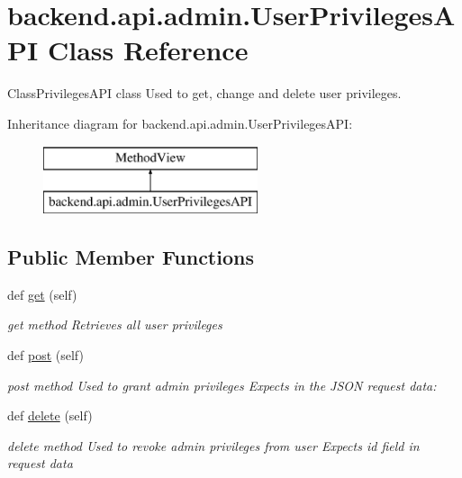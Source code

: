 \hypertarget{classbackend_1_1api_1_1admin_1_1_user_privileges_a_p_i}{}\section{backend.\+api.\+admin.\+User\+Privileges\+A\+P\+I Class Reference}
\label{classbackend_1_1api_1_1admin_1_1_user_privileges_a_p_i}


Class\+Privileges\+A\+P\+I class Used to get, change and delete user privileges.  


Inheritance diagram for backend.\+api.\+admin.\+User\+Privileges\+A\+P\+I\+:\begin{figure}[H]
\begin{center}
\leavevmode
\includegraphics[height=2.000000cm]{classbackend_1_1api_1_1admin_1_1_user_privileges_a_p_i}
\end{center}
\end{figure}
\subsection*{Public Member Functions}
\begin{DoxyCompactItemize}
\item 
\hypertarget{classbackend_1_1api_1_1admin_1_1_user_privileges_a_p_i_a46622ebb4e5e80a580f7ad271ba652ee}{}def \hyperlink{classbackend_1_1api_1_1admin_1_1_user_privileges_a_p_i_a46622ebb4e5e80a580f7ad271ba652ee}{get} (self)\label{classbackend_1_1api_1_1admin_1_1_user_privileges_a_p_i_a46622ebb4e5e80a580f7ad271ba652ee}

\begin{DoxyCompactList}\small\item\em get method Retrieves all user privileges \end{DoxyCompactList}\item 
def \hyperlink{classbackend_1_1api_1_1admin_1_1_user_privileges_a_p_i_a90b93942068919b1541432a4e3704c04}{post} (self)
\begin{DoxyCompactList}\small\item\em post method Used to grant admin privileges Expects in the J\+S\+O\+N request data\+: \end{DoxyCompactList}\item 
\hypertarget{classbackend_1_1api_1_1admin_1_1_user_privileges_a_p_i_a3bebea091bb87faab77d7d139cbc0a66}{}def \hyperlink{classbackend_1_1api_1_1admin_1_1_user_privileges_a_p_i_a3bebea091bb87faab77d7d139cbc0a66}{delete} (self)\label{classbackend_1_1api_1_1admin_1_1_user_privileges_a_p_i_a3bebea091bb87faab77d7d139cbc0a66}

\begin{DoxyCompactList}\small\item\em delete method Used to revoke admin privileges from user Expects id field in request data \end{DoxyCompactList}\end{DoxyCompactItemize}


